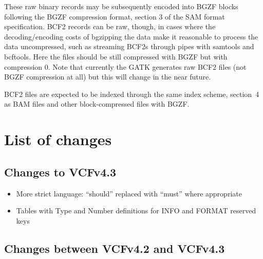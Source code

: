 \documentclass[8pt]{article}
\begin{document}
These raw binary records may be subsequently encoded into BGZF blocks following the BGZF compression format, section 3 of the SAM format specification.
BCF2 records can be raw, though, in cases where the decoding/encoding costs of bgzipping the data make it reasonable to process the data uncompressed, such as streaming BCF2s through pipes with samtools and bcftools.
Here the files should be still compressed with BGZF but with compression 0.
Note that currently the GATK generates raw BCF2 files (not BGZF compression at all) but this will change in the near future.

BCF2 files are expected to be indexed through the same index scheme, section~4 as BAM files and other block-compressed files with BGZF.

\section{List of changes}

\subsection{Changes to VCFv4.3}

\begin{itemize}
\item More strict language: ``should'' replaced with ``must'' where appropriate
\item Tables with Type and Number definitions for INFO and FORMAT reserved keys
\end{itemize}

\subsection{Changes between VCFv4.2 and VCFv4.3}
\end{document}
